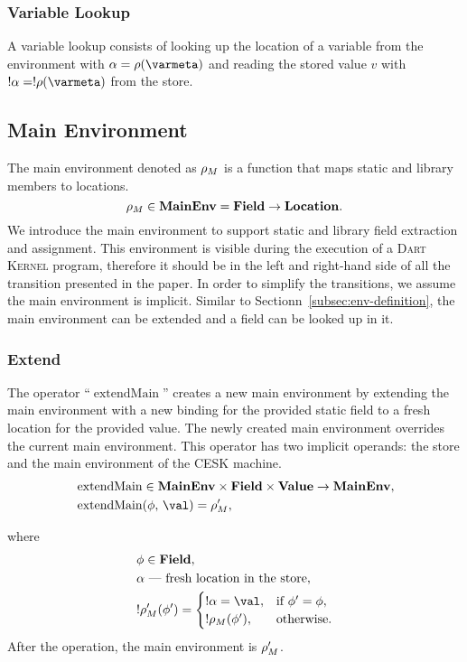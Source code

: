 \documentclass[a4paper,oneside,fleqn]{article}
\newcommand{\kernel}{\textsc{Dart Kernel}}
\DeclareMathOperator{\extendMain}{extendMain}
\newcommand{\dmenv}{\mathbf{MainEnv}}
\newcommand{\dfield}{\mathbf{Field}}
\newcommand{\dval}{\mathbf{Value}}
\begin{document}
\subsubsection{Variable Lookup}
\label{subsubsec:variable-lookup}

A variable lookup consists of looking up the location of a variable from the environment with $\loc = \env(\varmeta)$ and reading the stored value $v$ with $\deref{\loc} = \deref{\env(\varmeta)}$ from the store.


\subsection{Main Environment}
\label{subsec:main-env}

The main environment denoted as $\rho_{M}$ is a function that maps static and library members to locations.
\[
    \mainenv \in \dmenv = \dfield \rightarrow \dlocation.
\]
We introduce the main environment to support static and library field extraction and assignment.
This environment is visible during the execution of a \kernel{} program, therefore it should be in the left and right-hand side of all the transition presented in the paper.
In order to simplify the transitions, we assume the main environment is implicit.
Similar to Sectionn~\ref{subsec:env-definition}, the main environment can be extended and a field can be looked up in it.

\subsubsection{Extend}
\label{subsubsec:extend-main-env}

The operator ``$\extendMain$'' creates a new main environment by extending the main environment with a new binding for the provided static field to a fresh location for the provided value.
The newly created main environment overrides the current main environment.
This operator has two implicit operands: the store and the main environment of the CESK machine.
\begin{align*}
    &\extendMain \in \dmenv \times \dfield \times \dval \rightarrow  \dmenv,\\
    &\extendMain({\field},\,{\val}) = \mainenv',
\end{align*}

\noindent where
\begin{align*}
    & \field \in \dfield,\\
    & \loc \text{ --- fresh location in the store},\\
    & !\mainenv'(\field') =\begin{cases}
        !\loc = \val, & \text{if }\field' = \field,\\
        !\mainenv(\field'), & \text{otherwise}.
    \end{cases}
\end{align*}
After the operation, the main environment is $\rho_{M}'$.
\end{document}
